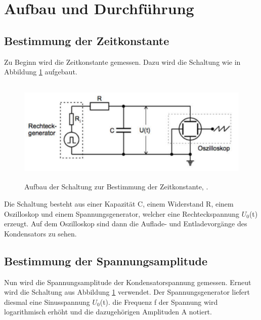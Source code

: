 \section{Aufbau und Durchführung}
\subsection{Bestimmung der Zeitkonstante}
Zu Beginn wird die Zeitkonstante gemessen. Dazu wird die Schaltung wie in Abbildung  \ref{fig:a} aufgebaut.
\begin{figure}[H]
  \centering
  \includegraphics[height=5cm]{Grafiken/a.pdf}
  \caption{Aufbau der Schaltung zur Bestimmung der Zeitkonstante, \cite{1}.}
  \label{fig:a}
\end{figure}
Die Schaltung besteht aus einer Kapazität C, einem Widerstand R, einem Oszilloskop und einem Spannungsgenerator, welcher eine Rechteckspannung $U_0$(t) erzeugt. Auf dem Oszilloskop sind dann die Auflade- und Entladevorgänge des Kondensators zu sehen. 

\subsection{Bestimmung der Spannungsamplitude}
Nun wird die Spannungsamplitude der Kondensatorspannung gemessen. Erneut wird die Schaltung aus Abbildung \ref{fig:a} verwendet.
Der Spannungsgenerator liefert diesmal eine Sinusspannung $U_0$(t). die Frequenz f der Spannung wird logarithmisch erhöht und die dazugehörigen Amplituden A notiert.

